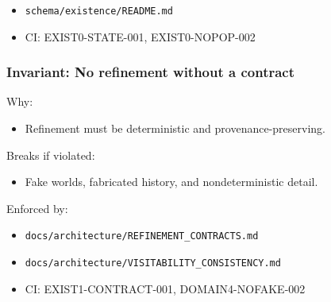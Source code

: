 \documentclass[9pt,a4paper,openany]{book}
\begin{document}
\begin{itemize}
\item \texttt{schema/\allowbreak{}existence/\allowbreak{}README.\allowbreak{}md}
\end{itemize}


\begin{itemize}
\item CI: EXIST0-\allowbreak{}STATE-\allowbreak{}001, EXIST0-\allowbreak{}NOPOP-\allowbreak{}002
\end{itemize}





\subsubsection{Invariant: No refinement without a contract}


Why:



\begin{itemize}
\item Refinement must be deterministic and provenance-\allowbreak{}preserving.\allowbreak{}
\end{itemize}


Breaks if violated:



\begin{itemize}
\item Fake worlds, fabricated history, and nondeterministic detail.\allowbreak{}
\end{itemize}


Enforced by:



\begin{itemize}
\item \texttt{docs/\allowbreak{}architecture/\allowbreak{}REFINEMENT\_\allowbreak{}CONTRACTS.\allowbreak{}md}
\end{itemize}


\begin{itemize}
\item \texttt{docs/\allowbreak{}architecture/\allowbreak{}VISITABILITY\_\allowbreak{}CONSISTENCY.\allowbreak{}md}
\end{itemize}


\begin{itemize}
\item CI: EXIST1-\allowbreak{}CONTRACT-\allowbreak{}001, DOMAIN4-\allowbreak{}NOFAKE-\allowbreak{}002
\end{itemize}
\end{document}
